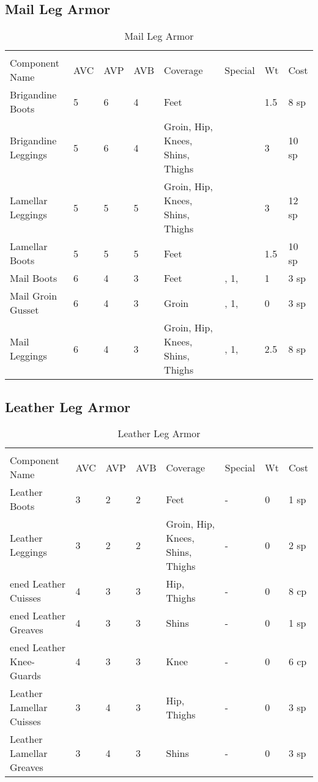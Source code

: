 \documentclass[oneside,11pt,english]{book}
\begin{document}
\subsection{Mail Leg Armor}
\begin{longtabu} to 
  \captionsetup{textformat=empty, labelformat=blank}
  \caption{Mail Leg Armor} \vspace{-15pt}
  \label{tab:Mail Leg Armor}\\
  Component Name&AVC&AVP&AVB& Coverage& Special& Wt&Cost\\\toprule
  Brigandine Boots& 5& 6& 4& Feet& & 1.5& 8 sp\\
  Brigandine Leggings& 5& 6& 4& Groin, Hip, Knees, Shins, Thighs& & 3& 10 sp\\
  Lamellar Leggings& 5& 5& 5& Groin, Hip, Knees, Shins, Thighs& & 3& 12 sp\\
  Lamellar Boots& 5& 5& 5& Feet& & 1.5& 10 sp\\
  Mail Boots& 6& 4& 3& Feet& ,  1, & 1& 3 sp\\
  Mail Groin Gusset& 6& 4& 3& Groin& ,  1, & 0& 3 sp\\
  Mail Leggings& 6& 4& 3& Groin, Hip, Knees, Shins, Thighs& ,  1, & 2.5& 8 sp\\
\end{longtabu}
\subsection{Leather Leg Armor}
\begin{longtabu} to 
  \captionsetup{textformat=empty, labelformat=blank}
  \caption{Leather Leg Armor} \vspace{-15pt}
  \label{tab:Leather Leg Armor}\\
  Component Name&AVC&AVP&AVB& Coverage& Special& Wt&Cost\\\toprule
  Leather Boots& 3& 2& 2& Feet& -& 0& 1 sp\\
  Leather Leggings& 3& 2& 2& Groin, Hip, Knees, Shins, Thighs& -& 0& 2 sp\\
  ened Leather Cuisses& 4& 3& 3& Hip, Thighs& -& 0& 8 cp\\
  ened Leather Greaves& 4& 3& 3& Shins& -& 0& 1 sp\\
  ened Leather Knee-Guards& 4& 3& 3& Knee& -& 0& 6 cp\\
  Leather Lamellar Cuisses& 3& 4& 3& Hip, Thighs& -& 0& 3 sp\\
  Leather Lamellar Greaves& 3& 4& 3& Shins& -& 0& 3 sp\\
\end{longtabu}
\end{document}
